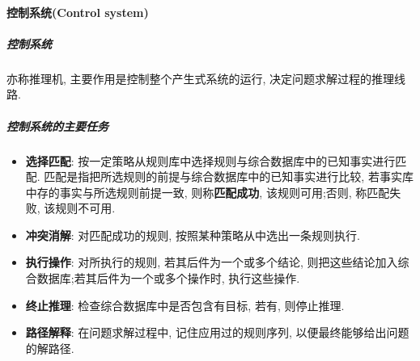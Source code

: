 \paragraph{控制系统(Control system)}
\subparagraph{控制系统}
    亦称推理机, 主要作用是控制整个产生式系统的运行, 决定问题求解过程的推理线路.
\subparagraph{控制系统的主要任务}
\begin{itemize}
\item \textbf{选择匹配}: 按一定策略从规则库中选择规则与综合数据库中的已知事实进行匹配. 匹配是指把所选规则的前提与综合数据库中的已知事实进行比较, 若事实库中存的事实与所选规则前提一致, 则称\textbf{匹配成功}, 该规则可用;否则, 称匹配失败, 该规则不可用.
\item \textbf{冲突消解}: 对匹配成功的规则, 按照某种策略从中选出一条规则执行.
\item \textbf{执行操作}: 对所执行的规则, 若其后件为一个或多个结论, 则把这些结论加入综合数据库;若其后件为一个或多个操作时, 执行这些操作.
\item \textbf{终止推理}: 检查综合数据库中是否包含有目标, 若有, 则停止推理.
\item \textbf{路径解释}: 在问题求解过程中, 记住应用过的规则序列, 以便最终能够给出问题的解路径.
\end{itemize}

